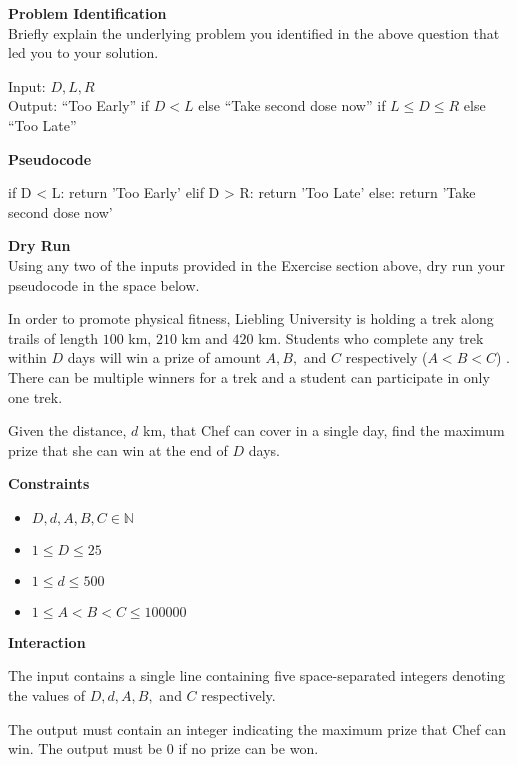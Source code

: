 \documentclass[a4paper]{exam}
\newcommand\heading[1]{\textbf{#1}}
\newcommand\inn{\in \mathbb{N}}
\begin{document}
\begin{questions}
    \heading{Problem Identification}\\
    Briefly explain the underlying problem you identified in the above question that led you to your solution.

  \begin{mdframed}
    Input: $D,L,R$\\
    Output: ``Too Early'' if $D<L$ else ``Take second dose now'' if $L\leq D \leq R$ else  ``Too Late''
  \end{mdframed}

    \heading{Pseudocode}
\begin{python}
if D < L:
    return 'Too Early'
elif D > R:
    return 'Too Late'
else:
    return 'Take second dose now'
\end{python}


    \heading{Dry Run}\\
    Using any two of the inputs provided in the Exercise section above, dry run your pseudocode in the space below.
    \vspace*{100pt}


    In order to promote physical fitness, Liebling University is holding a trek along trails of length $100$ km, $210$ km and $420$ km. Students who complete any trek within $D$ days will win a prize of amount $A,B,$ and $C$ respectively ($A<B<C$) . There can be multiple winners for a trek and a student can participate in only one trek.

    Given the distance, $d$ km, that Chef can cover in a single day, find the maximum prize that she can win at the end of $D$ days.

    \heading{Constraints}
    \begin{itemize}
        \item $D,d,A,B,C \inn$
        \item $1 \le D \le 25$
        \item $1 \le d \le 500$
        \item $1 \le A < B < C \le 100000$
    \end{itemize}


    \heading{Interaction}

    The input contains a single line containing five space-separated integers denoting the values of $D,d,A,B,$ and $C$ respectively.

    The output must contain an integer indicating the maximum prize that Chef can win. The output must be $0$ if no prize can be won.


\end{questions}
\end{document}
